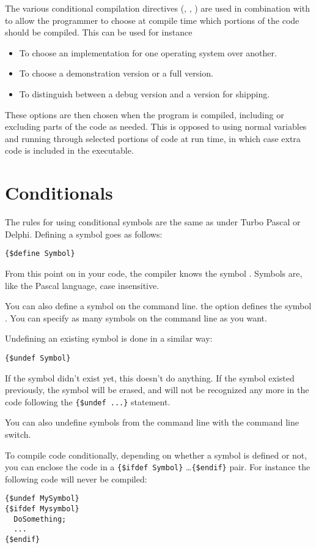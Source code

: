 The various conditional compilation directives (, ,
) are used in combination with 
to allow the programmer to choose at compile time which portions 
of the code should be compiled.  This can be used for instance
\begin{itemize}
\item To choose an implementation for one operating system over another.
\item To choose a demonstration version or a full version.
\item To distinguish between a debug version and a version for shipping.
\end{itemize}
These options are then chosen when the program is compiled, including or
excluding parts of the code as needed. This is opposed to using normal 
variables and running through selected portions of code at run time,
in which case extra code is included in the executable.

\section{Conditionals}
\label{se:Conditionals}
The rules for using conditional symbols are the same as under Turbo Pascal
or Delphi. Defining a symbol goes as follows:
\begin{verbatim}
{$define Symbol}
\end{verbatim}
From this point on in your code, the compiler knows the symbol .
Symbols are, like the Pascal language, case insensitive.

You can also define a symbol on the command line. the  option
defines the symbol . You can specify as many symbols on the
command line as you want.

Undefining an existing symbol is done in a similar way:
\begin{verbatim}
{$undef Symbol}
\end{verbatim}
If the symbol didn't exist yet, this doesn't do anything. If the symbol
existed previously, the symbol will be erased, and will not be recognized
any more in the code following the \verb|{$undef ...}| statement.

You can also undefine symbols from the command line with the 
command line switch.

To compile code conditionally, depending on whether a symbol is defined or
not, you can enclose the code in a \verb|{$ifdef Symbol}| \dots \verb|{$endif}|
pair. For instance the following code will never be compiled:
\begin{verbatim}
{$undef MySymbol}
{$ifdef Mysymbol}
  DoSomething;
  ...
{$endif}
\end{verbatim}

